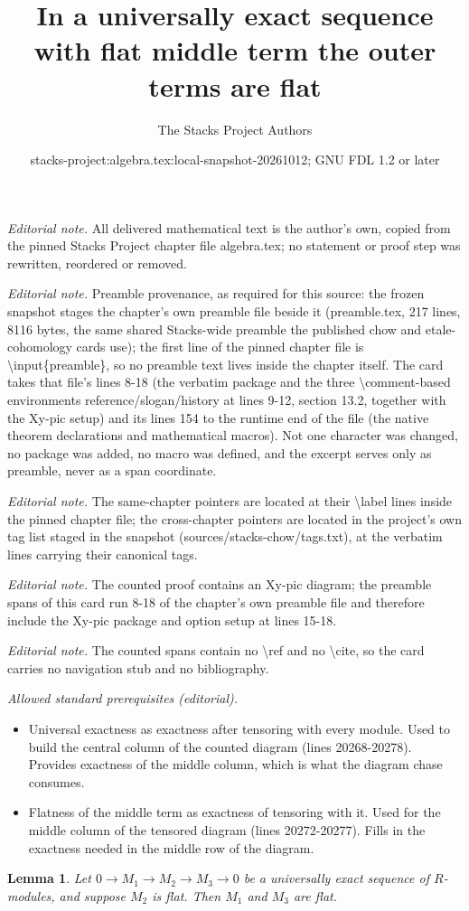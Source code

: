 \documentclass[10pt,a4paper]{amsart}
\title{In a universally exact sequence with flat middle term the outer terms are flat}
\author{The Stacks Project Authors}
\date{stacks-project:algebra.tex:local-snapshot-20261012; GNU FDL 1.2 or later}
\theoremstyle{plain}
\newtheorem{lemma}[subsection]{Lemma}
\theoremstyle{definition}
\theoremstyle{remark}
\numberwithin{equation}{subsection}
\begin{document}
\maketitle
\noindent\textit{Editorial note.} All delivered mathematical text is the author's own, copied from the pinned Stacks Project chapter file algebra.tex; no statement or proof step was rewritten, reordered or removed.\par\medskip
\noindent\textit{Editorial note.} Preamble provenance, as required for this source: the frozen snapshot stages the chapter's own preamble file beside it (preamble.tex, 217 lines, 8116 bytes, the same shared Stacks-wide preamble the published chow and etale-cohomology cards use); the first line of the pinned chapter file is \textbackslash{}input\{preamble\}, so no preamble text lives inside the chapter itself. The card takes that file's lines 8-18 (the verbatim package and the three \textbackslash{}comment-based environments reference/slogan/history at lines 9-12, section 13.2, together with the Xy-pic setup) and its lines 154 to the runtime end of the file (the native theorem declarations and mathematical macros). Not one character was changed, no package was added, no macro was defined, and the excerpt serves only as preamble, never as a span coordinate.\par\medskip
\noindent\textit{Editorial note.} The same-chapter pointers are located at their \textbackslash{}label lines inside the pinned chapter file; the cross-chapter pointers are located in the project's own tag list staged in the snapshot (sources/stacks-chow/tags.txt), at the verbatim lines carrying their canonical tags.\par\medskip
\noindent\textit{Editorial note.} The counted proof contains an Xy-pic diagram; the preamble spans of this card run 8-18 of the chapter's own preamble file and therefore include the Xy-pic package and option setup at lines 15-18.\par\medskip
\noindent\textit{Editorial note.} The counted spans contain no \textbackslash{}ref and no \textbackslash{}cite, so the card carries no navigation stub and no bibliography.\par\medskip
\noindent\textit{Allowed standard prerequisites (editorial).}\begin{itemize}
\item Universal exactness as exactness after tensoring with every module. Used to build the central column of the counted diagram (lines 20268-20278). Provides exactness of the middle column, which is what the diagram chase consumes.
\item Flatness of the middle term as exactness of tensoring with it. Used for the middle column of the tensored diagram (lines 20272-20277). Fills in the exactness needed in the middle row of the diagram.
\end{itemize}\medskip
\begin{lemma}
\label{lemma-ui-flat-domain}
Let $0 \to M_1 \to M_2 \to M_3 \to 0$ be a universally exact sequence
of $R$-modules, and suppose $M_2$ is flat.
Then $M_1$ and $M_3$ are flat.
\end{lemma}
\end{document}
